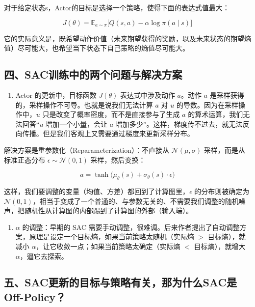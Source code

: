 对于给定状态s，Actor的目标是选择一个策略，使得下面的表达式值最大：

\[
J(\theta)
=
\mathbb{E}_{a\sim\pi}
\bigl[
Q(s,a)
-
\alpha\log\pi(a\mid s)
\bigr]
\]

它的实际意义是，既希望动作价值（未来期望获得的奖励，以及未来状态的期望熵值）尽可能大，也希望当下状态下自己策略的熵值尽可能大。

\hypertarget{ux56dbsacux8badux7ec3ux4e2dux7684ux4e24ux4e2aux95eeux9898ux4e0eux89e3ux51b3ux65b9ux6848}{%
\subsection{四、SAC训练中的两个问题与解决方案}\label{ux56dbsacux8badux7ec3ux4e2dux7684ux4e24ux4e2aux95eeux9898ux4e0eux89e3ux51b3ux65b9ux6848}}

\begin{enumerate}
\def\labelenumi{\arabic{enumi}.}
\tightlist
\item
  Actor 的更新中，目标函数 \(J(\theta)\) 表达式中涉及动作 \(a\)。动作 \(a\) 是采样获得的，采样操作不可导。也就是说我们无法计算 \(a\) 对 \(u\) 的导数。因为在采样操作中，\(u\) 只是改变了概率密度，而不是直接参与了生成 \(a\) 的算术运算，我们无法回答``\(u\) 增加一个小量，会让 \(a\) 增加多少''。这样，梯度传不过去，就无法反向传播。但是我们客观上又需要通过梯度来更新采样分布。
\end{enumerate}

解决方案是重参数化（Reparameterization）：不直接从 \(\mathcal{N}(\mu,\sigma)\) 采样，而是从标准正态分布 \(\epsilon\sim\mathcal{N}(0,1)\) 采样，然后变换：

\[
a
=
\tanh\bigl(
\mu_\theta(s)+\sigma_\theta(s)\cdot\epsilon
\bigr)
\]

这样，我们要调整的变量（均值、方差）都回到了计算图里，\(\epsilon\) 的分布则被确定为 \(\mathcal{N}(0,1)\)，相当于变成了一个普通的、与参数无关的、不需要我们调整的随机噪声，把随机性从计算图的内部踢到了计算图的外部（输入端）。

\begin{enumerate}
\def\labelenumi{\arabic{enumi}.}
\setcounter{enumi}{1}
\tightlist
\item
  \(\alpha\) 的调整：早期的 SAC 需要手动调整，很难调。后来作者提出了自动调整方案，原理是设定一个目标熵，如果当前策略太随机（实际熵 \(>\) 目标熵），就减小 \(\alpha\)，让它收敛一点；如果当前策略太确定（实际熵 \(<\) 目标熵），就增大 \(\alpha\)，逼它去探索。
\end{enumerate}

\hypertarget{ux4e94sacux66f4ux65b0ux7684ux76eeux6807ux4e0eux7b56ux7565ux6709ux5173ux90a3ux4e3aux4ec0ux4e48sacux662foff-policy}{%
\subsection{五、SAC更新的目标与策略有关，那为什么SAC是Off-Policy？}\label{ux4e94sacux66f4ux65b0ux7684ux76eeux6807ux4e0eux7b56ux7565ux6709ux5173ux90a3ux4e3aux4ec0ux4e48sacux662foff-policy}}

